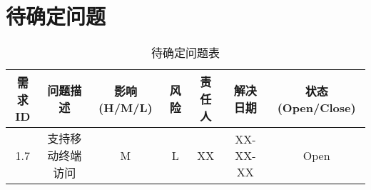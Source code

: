 \chapter{待确定问题}
\begin{table}[htbp]
\centering
\caption{待确定问题表} \label{tab:tbd_problems}
\begin{tabular}{|c|c|c|c|c|c|c|}
    \hline
    需求ID & 问题描述 & 影响(H/M/L) & 风险 & 责任人 & 解决日期 & 状态(Open/Close) \\
    \hline
    1.7 & 支持移动终端访问 & M & L & XX & XX-XX-XX & Open\\
    \hline

    \hline
\end{tabular}
\end{table}